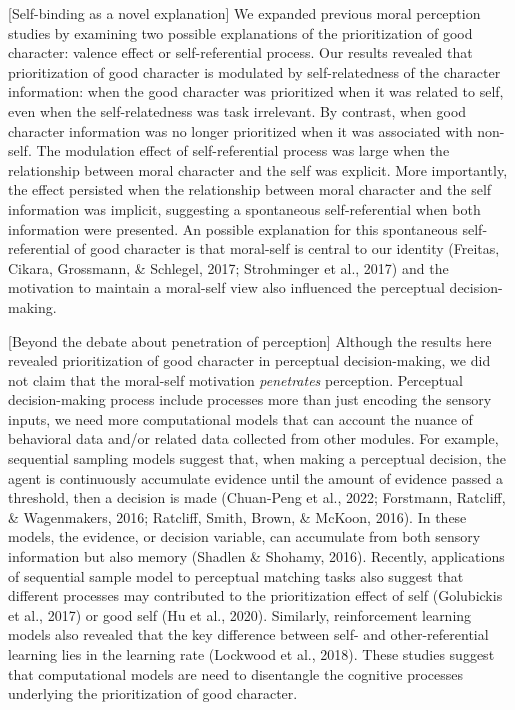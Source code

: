 \documentclass[
  man]{apa6}
\begin{document}
{[}Self-binding as a novel explanation{]} We expanded previous moral perception studies by examining two possible explanations of the prioritization of good character: valence effect or self-referential process. Our results revealed that prioritization of good character is modulated by self-relatedness of the character information: when the good character was prioritized when it was related to self, even when the self-relatedness was task irrelevant. By contrast, when good character information was no longer prioritized when it was associated with non-self. The modulation effect of self-referential process was large when the relationship between moral character and the self was explicit. More importantly, the effect persisted when the relationship between moral character and the self information was implicit, suggesting a spontaneous self-referential when both information were presented. An possible explanation for this spontaneous self-referential of good character is that moral-self is central to our identity (Freitas, Cikara, Grossmann, \& Schlegel, 2017; Strohminger et al., 2017) and the motivation to maintain a moral-self view also influenced the perceptual decision-making.

{[}Beyond the debate about penetration of perception{]}
Although the results here revealed prioritization of good character in perceptual decision-making, we did not claim that the moral-self motivation \emph{penetrates} perception. Perceptual decision-making process include processes more than just encoding the sensory inputs, we need more computational models that can account the nuance of behavioral data and/or related data collected from other modules. For example, sequential sampling models suggest that, when making a perceptual decision, the agent is continuously accumulate evidence until the amount of evidence passed a threshold, then a decision is made (Chuan-Peng et al., 2022; Forstmann, Ratcliff, \& Wagenmakers, 2016; Ratcliff, Smith, Brown, \& McKoon, 2016). In these models, the evidence, or decision variable, can accumulate from both sensory information but also memory (Shadlen \& Shohamy, 2016). Recently, applications of sequential sample model to perceptual matching tasks also suggest that different processes may contributed to the prioritization effect of self (Golubickis et al., 2017) or good self (Hu et al., 2020). Similarly, reinforcement learning models also revealed that the key difference between self- and other-referential learning lies in the learning rate (Lockwood et al., 2018). These studies suggest that computational models are need to disentangle the cognitive processes underlying the prioritization of good character.
\end{document}
